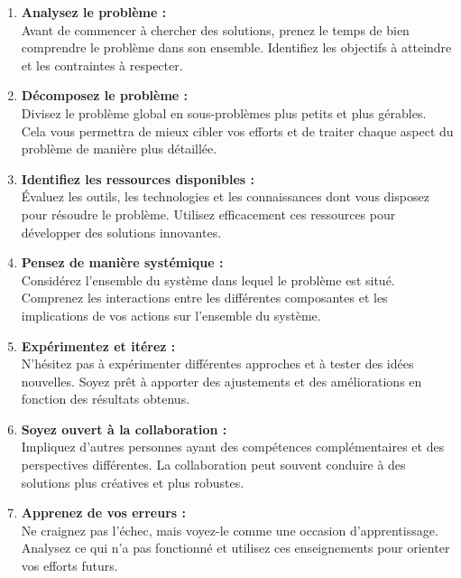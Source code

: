 \documentclass[a4paper,12pt]{report}
\begin{document}
\begin{enumerate}
    \item \textbf{Analysez le problème :}\\
    Avant de commencer à chercher des solutions, prenez le temps de bien comprendre le problème dans son ensemble. Identifiez les objectifs à atteindre et les contraintes à respecter.\\
    
    \item \textbf{Décomposez le problème :}\\
    Divisez le problème global en sous-problèmes plus petits et plus gérables. Cela vous permettra de mieux cibler vos efforts et de traiter chaque aspect du problème de manière plus détaillée.\\
    
    \item \textbf{Identifiez les ressources disponibles :}\\
    Évaluez les outils, les technologies et les connaissances dont vous disposez pour résoudre le problème. Utilisez efficacement ces ressources pour développer des solutions innovantes.\\
    
    \item \textbf{Pensez de manière systémique :}\\
    Considérez l'ensemble du système dans lequel le problème est situé. Comprenez les interactions entre les différentes composantes et les implications de vos actions sur l'ensemble du système.\\
    
    \item \textbf{Expérimentez et itérez :}\\
    N'hésitez pas à expérimenter différentes approches et à tester des idées nouvelles. Soyez prêt à apporter des ajustements et des améliorations en fonction des résultats obtenus.\\
    
    \item \textbf{Soyez ouvert à la collaboration :}\\
    Impliquez d'autres personnes ayant des compétences complémentaires et des perspectives différentes. La collaboration peut souvent conduire à des solutions plus créatives et plus robustes.\\
    
    \item \textbf{Apprenez de vos erreurs :}\\
    Ne craignez pas l'échec, mais voyez-le comme une occasion d'apprentissage. Analysez ce qui n'a pas fonctionné et utilisez ces enseignements pour orienter vos efforts futurs.\\
\end{enumerate}
\end{document}
